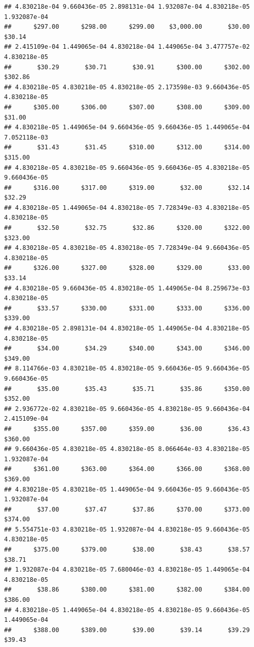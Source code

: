 \begin{verbatim}
## 4.830218e-04 9.660436e-05 2.898131e-04 1.932087e-04 4.830218e-05 1.932087e-04 
##      $297.00      $298.00      $299.00    $3,000.00       $30.00       $30.14 
## 2.415109e-04 1.449065e-04 4.830218e-04 1.449065e-04 3.477757e-02 4.830218e-05 
##       $30.29       $30.71       $30.91      $300.00      $302.00      $302.86 
## 4.830218e-05 4.830218e-05 4.830218e-05 2.173598e-03 9.660436e-05 4.830218e-05 
##      $305.00      $306.00      $307.00      $308.00      $309.00       $31.00 
## 4.830218e-05 1.449065e-04 9.660436e-05 9.660436e-05 1.449065e-04 7.052118e-03 
##       $31.43       $31.45      $310.00      $312.00      $314.00      $315.00 
## 4.830218e-05 4.830218e-05 9.660436e-05 9.660436e-05 4.830218e-05 9.660436e-05 
##      $316.00      $317.00      $319.00       $32.00       $32.14       $32.29 
## 4.830218e-05 1.449065e-04 4.830218e-05 7.728349e-03 4.830218e-05 4.830218e-05 
##       $32.50       $32.75       $32.86      $320.00      $322.00      $323.00 
## 4.830218e-05 4.830218e-05 4.830218e-05 7.728349e-04 9.660436e-05 4.830218e-05 
##      $326.00      $327.00      $328.00      $329.00       $33.00       $33.14 
## 4.830218e-05 9.660436e-05 4.830218e-05 1.449065e-04 8.259673e-03 4.830218e-05 
##       $33.57      $330.00      $331.00      $333.00      $336.00      $339.00 
## 4.830218e-05 2.898131e-04 4.830218e-05 1.449065e-04 4.830218e-05 4.830218e-05 
##       $34.00       $34.29      $340.00      $343.00      $346.00      $349.00 
## 8.114766e-03 4.830218e-05 4.830218e-05 9.660436e-05 9.660436e-05 9.660436e-05 
##       $35.00       $35.43       $35.71       $35.86      $350.00      $352.00 
## 2.936772e-02 4.830218e-05 9.660436e-05 4.830218e-05 9.660436e-04 2.415109e-04 
##      $355.00      $357.00      $359.00       $36.00       $36.43      $360.00 
## 9.660436e-05 4.830218e-05 4.830218e-05 8.066464e-03 4.830218e-05 1.932087e-04 
##      $361.00      $363.00      $364.00      $366.00      $368.00      $369.00 
## 4.830218e-05 4.830218e-05 1.449065e-04 9.660436e-05 9.660436e-05 1.932087e-04 
##       $37.00       $37.47       $37.86      $370.00      $373.00      $374.00 
## 5.554751e-03 4.830218e-05 1.932087e-04 4.830218e-05 9.660436e-05 4.830218e-05 
##      $375.00      $379.00       $38.00       $38.43       $38.57       $38.71 
## 1.932087e-04 4.830218e-05 7.680046e-03 4.830218e-05 1.449065e-04 4.830218e-05 
##       $38.86      $380.00      $381.00      $382.00      $384.00      $386.00 
## 4.830218e-05 1.449065e-04 4.830218e-05 4.830218e-05 9.660436e-05 1.449065e-04 
##      $388.00      $389.00       $39.00       $39.14       $39.29       $39.43 

\end{verbatim}
